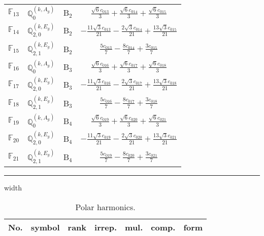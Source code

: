 \documentclass[fleqn,10pt,landscape]{article}
\begin{document}
\begin{itemize}
\begin{center}
\begin{longtable}{c|c|c|c}
$ \mathbb{F}_{13} $ & $\mathbb{Q}_{0}^{(k,A_{g})}$ & B$_{2}$ & $\frac{\sqrt{6} c_{013}}{3} + \frac{\sqrt{6} c_{014}}{3} + \frac{\sqrt{6} c_{015}}{3}$ \\
$ \mathbb{F}_{14} $ & $\mathbb{Q}_{2,0}^{(k,E_{g})}$ & B$_{2}$ & $- \frac{11 \sqrt{3} c_{013}}{21} - \frac{2 \sqrt{3} c_{014}}{21} + \frac{13 \sqrt{3} c_{015}}{21}$ \\
$ \mathbb{F}_{15} $ & $\mathbb{Q}_{2,1}^{(k,E_{g})}$ & B$_{2}$ & $\frac{5 c_{013}}{7} - \frac{8 c_{014}}{7} + \frac{3 c_{015}}{7}$ \\ \hline
$ \mathbb{F}_{16} $ & $\mathbb{Q}_{0}^{(k,A_{g})}$ & B$_{3}$ & $\frac{\sqrt{6} c_{016}}{3} + \frac{\sqrt{6} c_{017}}{3} + \frac{\sqrt{6} c_{018}}{3}$ \\
$ \mathbb{F}_{17} $ & $\mathbb{Q}_{2,0}^{(k,E_{g})}$ & B$_{3}$ & $- \frac{11 \sqrt{3} c_{016}}{21} - \frac{2 \sqrt{3} c_{017}}{21} + \frac{13 \sqrt{3} c_{018}}{21}$ \\
$ \mathbb{F}_{18} $ & $\mathbb{Q}_{2,1}^{(k,E_{g})}$ & B$_{3}$ & $\frac{5 c_{016}}{7} - \frac{8 c_{017}}{7} + \frac{3 c_{018}}{7}$ \\ \hline
$ \mathbb{F}_{19} $ & $\mathbb{Q}_{0}^{(k,A_{g})}$ & B$_{4}$ & $\frac{\sqrt{6} c_{019}}{3} + \frac{\sqrt{6} c_{020}}{3} + \frac{\sqrt{6} c_{021}}{3}$ \\
$ \mathbb{F}_{20} $ & $\mathbb{Q}_{2,0}^{(k,E_{g})}$ & B$_{4}$ & $- \frac{11 \sqrt{3} c_{019}}{21} - \frac{2 \sqrt{3} c_{020}}{21} + \frac{13 \sqrt{3} c_{021}}{21}$ \\
$ \mathbb{F}_{21} $ & $\mathbb{Q}_{2,1}^{(k,E_{g})}$ & B$_{4}$ & $\frac{5 c_{019}}{7} - \frac{8 c_{020}}{7} + \frac{3 c_{021}}{7}$ \\
\end{longtable}
\end{center}

 \hfil \hrule height 1mm width \textwidth \hfil

\begin{center}
\renewcommand{\arraystretch}{1.3}
\begin{longtable}{ccccccc}
\caption{Polar harmonics.}
 \\
 \hline \hline
No. & symbol & rank & irrep. & mul. & comp. & form \\ \hline \endfirsthead


\end{longtable}
\end{center}
\end{itemize}
\end{document}
